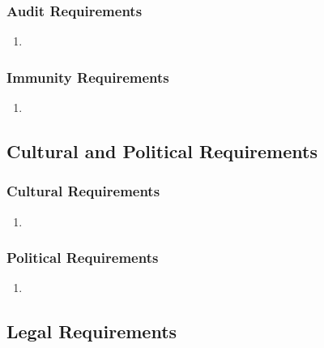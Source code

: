 \documentclass[]{article}
\begin{document}
\subsubsection{Audit Requirements}
\label{ssub:audit_requirements}
\begin{enumerate}[{SR-AU}1. ]
	\item 
\end{enumerate}

\subsubsection{Immunity Requirements}
\label{ssub:immunity_requirements}
\begin{enumerate}[{SR-IM}1. ]
	\item 
\end{enumerate}


\subsection{Cultural and Political Requirements}
\label{sub:cultural_and_political_requirements}

\subsubsection{Cultural Requirements}
\label{ssub:cultural_requirements}
\begin{enumerate}[{CP-C}1. ]
	\item 
\end{enumerate}

\subsubsection{Political Requirements}
\label{ssub:political_requirements}
\begin{enumerate}[{CP-P}1. ]
	\item 
\end{enumerate}


\subsection{Legal Requirements}
\label{sub:legal_requirements}
\end{document}
